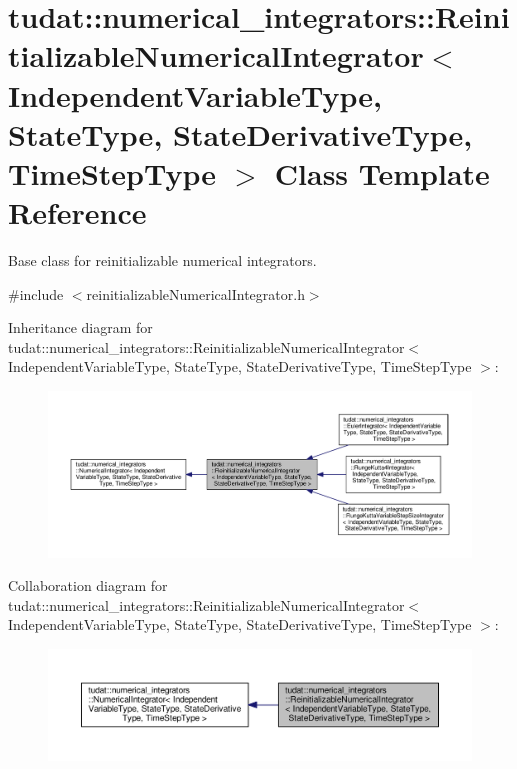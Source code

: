\hypertarget{classtudat_1_1numerical__integrators_1_1ReinitializableNumericalIntegrator}{}\section{tudat\+:\+:numerical\+\_\+integrators\+:\+:Reinitializable\+Numerical\+Integrator$<$ Independent\+Variable\+Type, State\+Type, State\+Derivative\+Type, Time\+Step\+Type $>$ Class Template Reference}
\label{classtudat_1_1numerical__integrators_1_1ReinitializableNumericalIntegrator}


Base class for reinitializable numerical integrators.  




{\ttfamily \#include $<$reinitializable\+Numerical\+Integrator.\+h$>$}



Inheritance diagram for tudat\+:\+:numerical\+\_\+integrators\+:\+:Reinitializable\+Numerical\+Integrator$<$ Independent\+Variable\+Type, State\+Type, State\+Derivative\+Type, Time\+Step\+Type $>$\+:
\nopagebreak
\begin{figure}[H]
\begin{center}
\leavevmode
\includegraphics[width=350pt]{classtudat_1_1numerical__integrators_1_1ReinitializableNumericalIntegrator__inherit__graph}
\end{center}
\end{figure}


Collaboration diagram for tudat\+:\+:numerical\+\_\+integrators\+:\+:Reinitializable\+Numerical\+Integrator$<$ Independent\+Variable\+Type, State\+Type, State\+Derivative\+Type, Time\+Step\+Type $>$\+:
\nopagebreak
\begin{figure}[H]
\begin{center}
\leavevmode
\includegraphics[width=350pt]{classtudat_1_1numerical__integrators_1_1ReinitializableNumericalIntegrator__coll__graph}
\end{center}
\end{figure}
